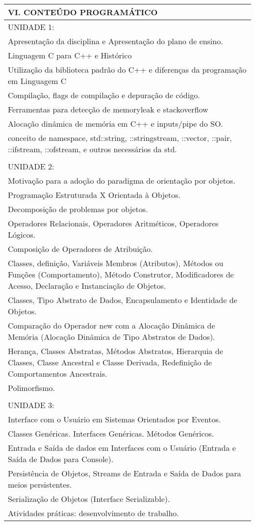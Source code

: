 \documentclass[12pt]{article}
\begin{document}
\begin{longtable}{|L{1.025\textwidth}|} \hline
%
{\bf VI. CONTEÚDO PROGRAMÁTICO } \\ \hline
UNIDADE 1:\\
Apresentação da disciplina e Apresentação do plano de ensino.\\
Linguagem C para C++ e Histórico\\
Utilização da biblioteca padrão do C++ e diferenças da programação em Linguagem C\\
Compilação, flags de compilação e depuração de código. \\
Ferramentas para detecção de memoryleak e stackoverflow\\
Alocação dinâmica de memória em C++ e inputs/pipe do SO.\\
conceito   de   namespace,  std::string,   ::stringstream,   ::vector,   ::pair,   ::ifstream,   ::ofstream, e outros necessários da std.\\
\\

UNIDADE 2:\\
Motivação para a adoção do paradigma de orientação por objetos.\\
Programação Estruturada X Orientada à Objetos.\\
Decomposição de problemas por objetos. \\
Operadores Relacionais, Operadores Aritméticos, Operadores Lógicos.\\
Composição de Operadores de Atribuição.\\
Classes,   definição,   Variáveis  Membros  (Atributos),   Métodos  ou   Funções  (Comportamento),   Método Construtor, Modificadores de Acesso, Declaração e Instanciação de Objetos.\\
Classes, Tipo Abstrato de Dados, Encapsulamento e Identidade de Objetos. \\
Comparação do Operador new com a Alocação Dinâmica de Memória (Alocação Dinâmica de Tipo Abstratos de Dados).\\
Herança, Classes Abstratas, Métodos Abstratos, Hierarquia de Classes, Classe Ancestral e Classe Derivada, Redefinição de Comportamentos Ancestrais. \\
Polimorfismo.\\
\\

UNIDADE 3:\\
Interface com o Usuário em Sistemas Orientados por Eventos.\\
Classes Genéricas. Interfaces Genéricas. Métodos Genéricos.\\ Entrada e Saída de dados em Interfaces com o Usuário (Entrada e Saída de Dados para Console).\\
Persistência de Objetos, Streams de Entrada e Saída de Dados para meios persistentes. \\
Serialização de Objetos (Interface Serializable).\\
Atividades práticas: desenvolvimento de trabalho.
\\ \hline
\end{longtable} 
\end{document}
